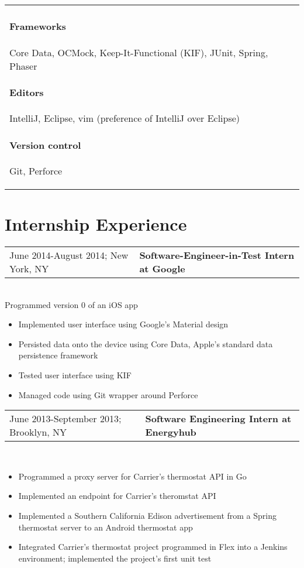 \documentclass[letterpaper,10pt]{article} %
\begin{document}
\begin{tabular}{ll}
\begin{minipage}[t]{3.75in}
        \paragraph{Frameworks} Core Data, OCMock, Keep-It-Functional (KIF), JUnit, {\footnotesize Spring, Phaser}
        \paragraph{Editors} IntelliJ, Eclipse, vim {\footnotesize (preference of IntelliJ over Eclipse)}
        \paragraph{Version control} Git, Perforce
    \end{minipage}
\end{tabular}

\section{Internship Experience}
\begin{tabular}{@{}p{3in}l}
    June 2014-August 2014; New York, NY & \textbf{Software-Engineer-in-Test Intern at Google}
\end{tabular} \\
Programmed version 0 of an iOS app
\begin{itemize}
    \item Implemented user interface using Google's Material design
    \item Persisted data onto the device using Core Data, Apple's standard data persistence framework
    \item Tested user interface using KIF
    \item Managed code using Git wrapper around Perforce
\end{itemize}

\begin{tabular}{@{}p{3in}l}
    June 2013-September 2013; Brooklyn, NY & \textbf{Software Engineering Intern at Energyhub}
\end{tabular} \\
\begin{itemize}
    \item Programmed a proxy server for Carrier's thermostat API in Go
    \item Implemented an endpoint for Carrier's theromstat API
    \item
        Implemented a Southern California Edison advertisement from a Spring thermostat server
        to an Android thermostat app
    \item
        Integrated Carrier’s thermostat project programmed in Flex into a Jenkins environment;
        implemented the project’s first unit test
\end{itemize}
\end{document}
